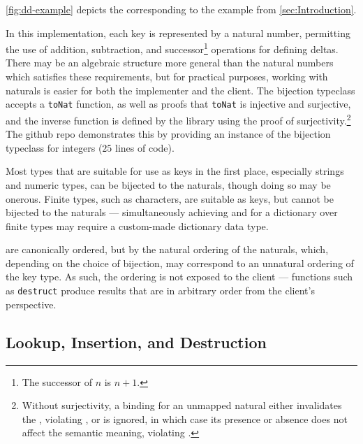 \autoref{fig:dd-example} depicts the \dd{} corresponding to the example from \autoref{sec:Introduction}.


In this implementation, each key is represented by a natural number, permitting the use of addition, subtraction, and successor\footnote{The successor of $n$ is $n+1$.} operations for defining deltas.
%
There may be an algebraic structure more general than the natural numbers which satisfies these requirements, but for practical purposes, working with naturals
%
is easier for both the implementer and the client. The bijection typeclass accepts a \texttt{toNat} function, as well as proofs that \texttt{toNat}
%
is injective and surjective, and the inverse function is defined by the library using the proof of surjectivity.\footnote{\hspace{0.01in}%
%
Without surjectivity, a binding for an unmapped natural either invalidates the \dd, violating \Total, or is ignored, in which case its presence or absence does not affect the semantic meaning, violating \Extensional.
%
}
%
The github repo \citep{github:agda} demonstrates this by providing an instance of the bijection typeclass for integers ($25$ lines of code).

Most types that are suitable for use as keys in the first place, especially strings and numeric types, can be bijected to the naturals,
%
though doing so may be onerous. Finite types, such as characters, are suitable as keys, but cannot be bijected to the naturals ---
%
simultaneously achieving \Total{} and \Extensional{} for a dictionary over finite types may require a custom-made dictionary data type.

\Ddls{} are canonically ordered, but by the natural ordering of the naturals, which, depending on the choice of bijection, may correspond to an unnatural
%
ordering of the key type. As such, the ordering is not exposed to the client --- functions such as \texttt{destruct} produce results
%
that are in arbitrary order from the client's perspective.


\subsection{Lookup, Insertion, and Destruction}
\label{sec:DD:basics}

